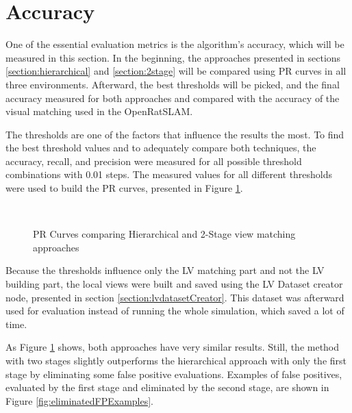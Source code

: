 \section{Accuracy}\label{section:accuracy}

One of the essential evaluation metrics is the algorithm's accuracy, which will be measured in this section. In the beginning, the approaches presented in sections \ref{section:hierarchical} and \ref{section:2stage} will be compared using PR curves in all three environments. Afterward, the best thresholds will be picked, and the final accuracy measured for both approaches and compared with the accuracy of the visual matching used in the OpenRatSLAM.\par
The thresholds are one of the factors that influence the results the most. To find the best threshold values and to adequately compare both techniques, the accuracy, recall, and precision were measured for all possible threshold combinations with 0.01 steps. The measured values for all different thresholds were used to build the PR curves, presented in Figure \ref{fig:prCurves}.\par

\begin{figure}[!tbp]
    \centering
    \hfill
    \\
    \caption{PR Curves comparing Hierarchical and 2-Stage view matching approaches}
    \label{fig:prCurves}
\end{figure}


Because the thresholds influence only the LV matching part and not the LV building part, the local views were built and saved using the LV Dataset creator node, presented in section \ref{section:lvdatasetCreator}. This dataset was afterward used for evaluation instead of running the whole simulation, which saved a lot of time.\par
As Figure \ref{fig:prCurves} shows, both approaches have very similar results. Still, the method with two stages slightly outperforms the hierarchical approach with only the first stage by eliminating some false positive evaluations. Examples of false positives, evaluated by the first stage and eliminated by the second stage, are shown in Figure \ref{fig:eliminatedFPExamples}.\par

